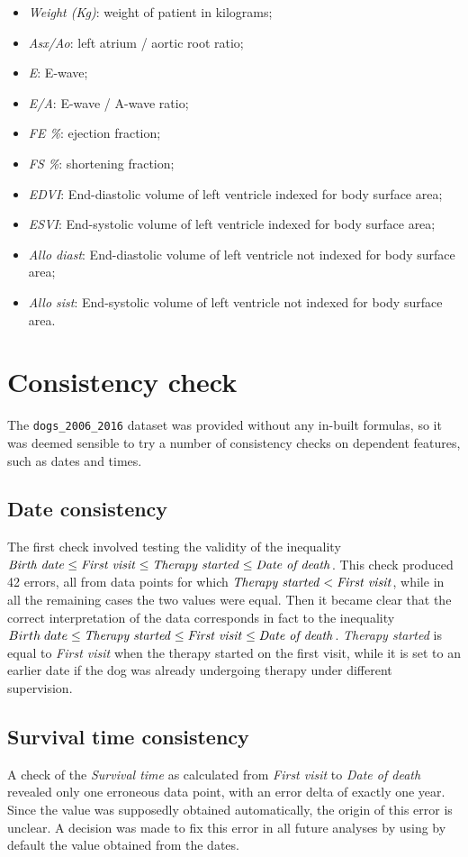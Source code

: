 \documentclass[12pt]{report}
\begin{document}
\begin{itemize}
\item \textit{Weight (Kg)}: weight of patient in kilograms;
\item \textit{Asx/Ao}: left atrium / aortic root ratio;
\item \textit{E}: E-wave;
\item \textit{E/A}:	E-wave / A-wave ratio;
\item \textit{FE \%}: ejection fraction;
\item \textit{FS \%}: shortening fraction;
\item \textit{EDVI}: End-diastolic volume of left ventricle indexed for body surface area;
\item \textit{ESVI}: End-systolic volume of left ventricle indexed for body surface area;
\item \textit{Allo diast}: End-diastolic volume of left ventricle not indexed for body surface area;
\item \textit{Allo sist}: End-systolic volume of left ventricle not indexed for body surface area.
\end{itemize}

\section{Consistency check}
The \texttt{dogs\_2006\_2016} dataset was provided without any in-built formulas, so it was deemed sensible to try a number of consistency checks on dependent features, such as dates and times.
\subsection*{Date consistency}
The first check involved testing the validity of the inequality $ \text{\emph{Birth date}} \leq \text{\emph{First visit}} \leq \text{\emph{Therapy started}} \leq \text{\emph{Date of death}} $. This check produced 42 errors, all from data points for which $ \text{\emph{Therapy started}} < \text{\emph{First visit}} $, while in all the remaining cases the two values were equal. Then it became clear that the correct interpretation of the data corresponds in fact to the inequality $ Birth\; date \leq \text{\emph{Therapy started}} \leq \text{\emph{First visit}} \leq \text{\emph{Date of death}} $. \textit{Therapy started} is equal to \textit{First visit} when the therapy started on the first visit, while it is set to an earlier date if the dog was already undergoing therapy under different supervision.
\subsection*{Survival time consistency}
A check of the \textit{Survival time} as calculated from \textit{First visit} to \textit{Date of death} revealed only one erroneous data point, with an error delta of exactly one year. Since the value was supposedly obtained automatically, the origin of this error is unclear. A decision was made to fix this error in all future analyses by using by default the value obtained from the dates.
\end{document}
